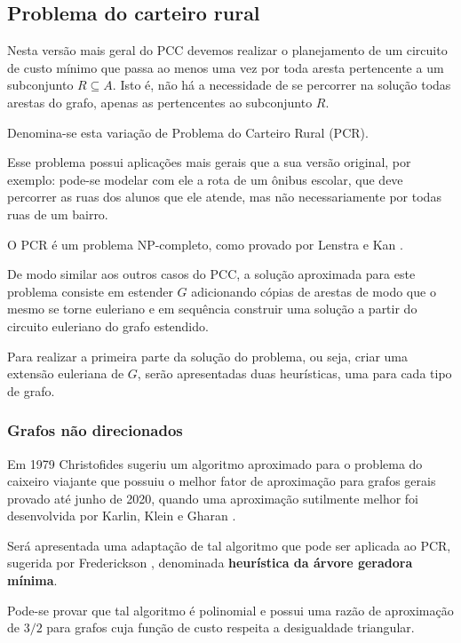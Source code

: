    \subsection{Problema do carteiro rural}
    
    Nesta versão mais geral do PCC devemos realizar o planejamento de um circuito de custo mínimo que passa ao menos uma vez por toda aresta pertencente a um subconjunto $R \subseteq A$. 
    Isto é, não há a necessidade de se percorrer na solução todas arestas do grafo, apenas as pertencentes ao subconjunto $R$.

    Denomina-se esta variação de Problema do Carteiro Rural (PCR).

    Esse problema possui aplicações mais gerais que a sua versão original, por exemplo: pode-se modelar com ele a rota de um ônibus escolar, que deve percorrer as ruas dos alunos que ele atende, mas não necessariamente por todas ruas de um bairro.

    O PCR é um problema NP-completo, como provado por Lenstra e Kan \cite{rural-np-complete}. 

    De modo similar aos outros casos do PCC, a solução aproximada para este problema consiste em estender $G$ adicionando cópias de arestas de modo que o mesmo se torne euleriano e em sequência construir uma solução a partir do circuito euleriano do grafo estendido.

    Para realizar a primeira parte da solução do problema, ou seja, criar uma extensão euleriana de $G$, serão apresentadas duas heurísticas, uma para cada tipo de grafo.

        \subsubsection{Grafos não direcionados}

        Em 1979 Christofides sugeriu um algoritmo aproximado para o problema do caixeiro viajante que possuiu o melhor fator de aproximação para grafos gerais provado \cite{wiki-christofides} até junho de 2020, quando uma aproximação sutilmente melhor foi desenvolvida por Karlin, Klein e Gharan \cite{klein-tsp}.

        Será apresentada uma adaptação de tal algoritmo que pode ser aplicada ao PCR, sugerida por Frederickson \cite{frederickson}, denominada \textbf{heurística da árvore geradora mínima}.

        Pode-se provar que tal algoritmo é polinomial e possui uma razão de aproximação de $3/2$ para grafos cuja função de custo respeita a desigualdade triangular.

